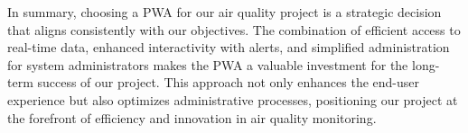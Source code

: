 \documentclass[english,10pt,a4paper]{article}
\begin{document}
	In summary, choosing a PWA for our air quality project is a strategic decision that aligns consistently with our objectives. The combination of efficient access to real-time data, enhanced interactivity with alerts, and simplified administration for system administrators makes the PWA a valuable investment for the long-term success of our project. This approach not only enhances the end-user experience but also optimizes administrative processes, positioning our project at the forefront of efficiency and innovation in air quality monitoring.
\end{document}
